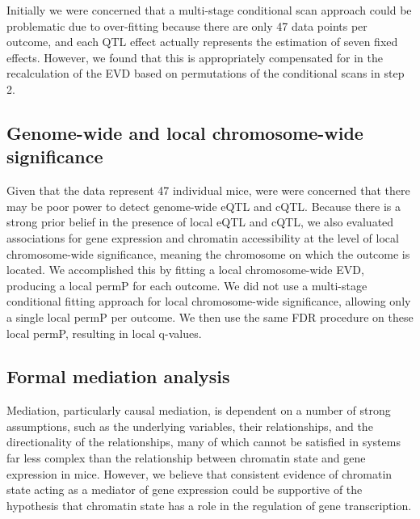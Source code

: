 Initially we were concerned that a multi-stage conditional scan approach could be problematic due to over-fitting because there are only 47 data points per outcome, and each $\text{QTL}$ effect actually represents the estimation of seven fixed effects. However, we found that this is appropriately compensated for in the recalculation of the EVD based on permutations of the conditional scans in step 2.

\subsection{Genome-wide and local chromosome-wide significance}

Given that the data represent 47 individual mice, were were concerned that there may be poor power to detect genome-wide eQTL and cQTL. Because there is a strong prior belief in the presence of local eQTL and cQTL, we also evaluated associations for gene expression and chromatin accessibility at the level of local chromosome-wide significance, meaning the chromosome on which the outcome is located. We accomplished this by fitting a local chromosome-wide EVD, producing a local permP for each outcome. We did not use a multi-stage conditional fitting approach for local chromosome-wide significance, allowing only a single local permP per outcome. We then use the same FDR procedure on these local permP, resulting in local q-values.

\subsection{Formal mediation analysis}

Mediation, particularly causal mediation, is dependent on a number of strong assumptions, such as the underlying variables, their relationships, and the directionality of the relationships, many of which cannot be satisfied in systems far less complex than the relationship between chromatin state and gene expression in mice. However, we believe that consistent evidence of chromatin state acting as a mediator of gene expression could be supportive of the hypothesis that chromatin state has a role in the regulation of gene transcription.


